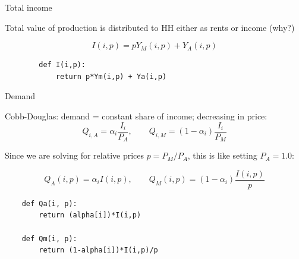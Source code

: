 \documentclass[notes,11pt, aspectratio=169, xcolor=table]{beamer}
\newenvironment{wideitemize}{\itemize\addtolength{\itemsep}{10pt}}{\enditemize}
\begin{document}
\begin{frame}[fragile=singleslide]{Total income}

\begin{wideitemize}
    
    \item Total value of production is distributed to HH either as rents or income (why?)

    \begin{equation*}
        I(i,p) = p Y_M(i,p) + Y_A(i,p)
    \end{equation*}

    \begin{verbatim}
        def I(i,p):
            return p*Ym(i,p) + Ya(i,p)
    \end{verbatim}

    
\end{wideitemize}

    
\end{frame}


\begin{frame}[fragile=singleslide]{Demand}

\begin{wideitemize}
    
    \item  Cobb-Douglas: demand = constant share of income; decreasing in price:
    \begin{equation*}\label{eq: demand}
    Q_{i,A} = \alpha_i  \frac{I_i}{P_{A}} , \qquad Q_{i,M} = (1-\alpha_i) \frac{I_i}{P_{M}}
    \end{equation*}

    \item Since we are solving for relative prices $p = P_M/P_A$, this is like setting $P_A =1.0$:

    \begin{equation*}
    Q_{A}(i,p) = \alpha_i  I(i,p)  , \qquad Q_{M}(i,p) = (1-\alpha_i) \frac{I(i,p)}{p}
    \end{equation*}

    \begin{verbatim}
    def Qa(i, p):
        return (alpha[i])*I(i,p)

    def Qm(i, p):
        return (1-alpha[i])*I(i,p)/p
    \end{verbatim}

        
    
\end{wideitemize}

    
\end{frame}
\end{document}
